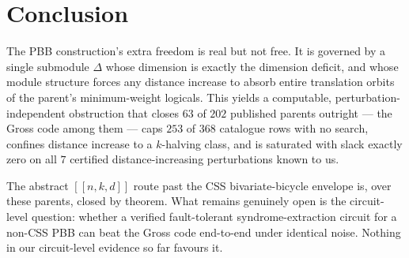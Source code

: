 \documentclass[11pt]{article}
\newcommand{\nk}[1]{[\![#1]\!]}
\theoremstyle{plain}
\theoremstyle{remark}
\begin{document}
\section{Conclusion}\label{sec:conclusion}

The PBB construction's extra freedom is real but not free. It is governed by a single
submodule $\Delta$ whose dimension is exactly the dimension deficit, and whose module
structure forces any distance increase to absorb entire translation orbits of the
parent's minimum-weight logicals. This yields a computable, perturbation-independent
obstruction that closes $63$ of $202$ published parents outright --- the Gross code among
them --- caps $253$ of $368$ catalogue rows with no search, confines distance increase to a
$k$-halving class, and is saturated with slack exactly zero on all $7$ certified
distance-increasing perturbations known to us.

The abstract $\nk{n,k,d}$ route past the CSS bivariate-bicycle envelope is, over these
parents, closed by theorem. What remains genuinely open is the circuit-level question:
whether a verified fault-tolerant syndrome-extraction circuit for a non-CSS PBB can beat
the Gross code end-to-end under identical noise. Nothing in our circuit-level evidence so
far favours it.

\nocite{wei2026lowweight,webster2026distance}



\end{document}
